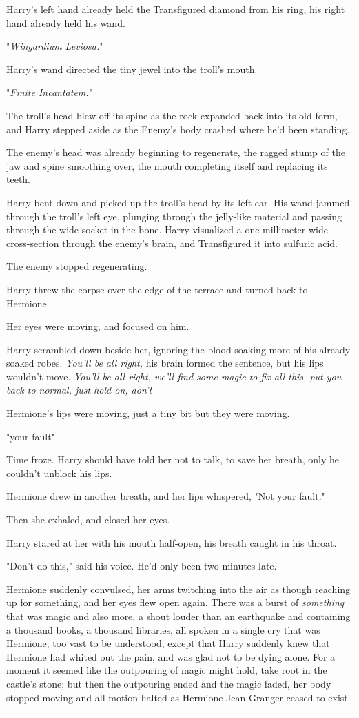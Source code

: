 Harry's left hand already held the Transfigured diamond from his ring, his
right hand already held his wand.

"\emph{Wingardium Leviosa.}"

Harry's wand directed the tiny jewel into the troll's mouth.

"\emph{Finite Incantatem.}"

The troll's head blew off its spine as the rock expanded back into its old
form, and Harry stepped aside as the Enemy's body crashed where he'd been
standing.

The enemy's head was already beginning to regenerate, the ragged stump of the
jaw and spine smoothing over, the mouth completing itself and replacing its
teeth.

Harry bent down and picked up the troll's head by its left ear. His wand jammed
through the troll's left eye, plunging through the jelly-like material and
passing through the wide socket in the bone. Harry visualized a
one-millimeter-wide cross-section through the enemy's brain, and Transfigured
it into sulfuric acid.

The enemy stopped regenerating.

Harry threw the corpse over the edge of the terrace and turned back to Hermione.

Her eyes were moving, and focused on him.

Harry scrambled down beside her, ignoring the blood soaking more of his
already-soaked robes. \emph{You'll be all right,} his brain formed the
sentence, but his lips wouldn't move. \emph{You'll be all right, we'll find
some magic to fix all this, put you back to normal, just hold on, don't---}

Hermione's lips were moving, just a tiny bit but they were moving.

"your{\el} fault{\el}"

Time froze. Harry should have told her not to talk, to save her breath, only he
couldn't unblock his lips.

Hermione drew in another breath, and her lips whispered, "Not your fault."

Then she exhaled, and closed her eyes.

Harry stared at her with his mouth half-open, his breath caught in his throat.

"Don't do this," said his voice. He'd only been two minutes late.

Hermione suddenly convulsed, her arms twitching into the air as though reaching
up for something, and her eyes flew open again. There was a burst of
\emph{something} that was magic and also more, a shout louder than an
earthquake and containing a thousand books, a thousand libraries, all spoken in
a single cry that was Hermione; too vast to be understood, except that Harry
suddenly knew that Hermione had whited out the pain, and was glad not to be
dying alone. For a moment it seemed like the outpouring of magic might hold,
take root in the castle's stone; but then the outpouring ended and the magic
faded, her body stopped moving and all motion halted as Hermione Jean Granger
ceased to exist---


